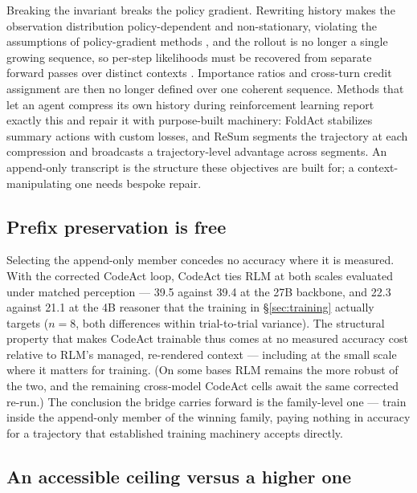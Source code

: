 Breaking the invariant breaks the policy gradient. Rewriting history makes the observation distribution policy-dependent and non-stationary, violating the assumptions of policy-gradient methods \citep{foldact}, and the rollout is no longer a single growing sequence, so per-step likelihoods must be recovered from separate forward passes over distinct contexts \citep{resum}. Importance ratios and cross-turn credit assignment are then no longer defined over one coherent sequence. Methods that let an agent compress its own history during reinforcement learning report exactly this and repair it with purpose-built machinery: FoldAct stabilizes summary actions with custom losses, and ReSum segments the trajectory at each compression and broadcasts a trajectory-level advantage across segments. An append-only transcript is the structure these objectives are built for; a context-manipulating one needs bespoke repair.

\subsection{Prefix preservation is free}

Selecting the append-only member concedes no accuracy where it is measured. With the corrected CodeAct loop, CodeAct ties RLM at both scales evaluated under matched perception --- 39.5 against 39.4 at the 27B backbone, and 22.3 against 21.1 at the 4B reasoner that the training in \S\ref{sec:training} actually targets ($n{=}8$, both differences within trial-to-trial variance). The structural property that makes CodeAct trainable thus comes at no measured accuracy cost relative to RLM's managed, re-rendered context --- including at the small scale where it matters for training. (On some bases RLM remains the more robust of the two, and the remaining cross-model CodeAct cells await the same corrected re-run.) The conclusion the bridge carries forward is the family-level one --- train inside the append-only member of the winning family, paying nothing in accuracy for a trajectory that established training machinery accepts directly.

\subsection{An accessible ceiling versus a higher one}

